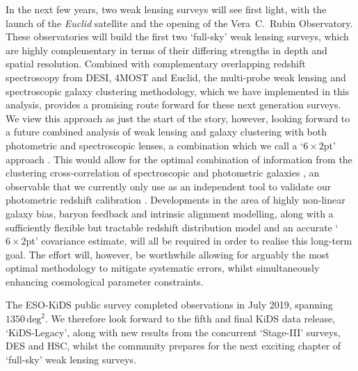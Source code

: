 In the next few years, two weak lensing surveys will see first light, with the launch of the {\it Euclid} satellite and the opening of the Vera~C.~Rubin Observatory.   These observatories will build the first two `full-sky' weak lensing surveys, which are highly complementary in terms of their differing strengths in depth and spatial resolution.  Combined with complementary overlapping redshift spectroscopy from DESI, 4MOST and Euclid, the multi-probe weak lensing and spectroscopic galaxy clustering methodology, which we have implemented in this analysis, provides a promising route forward for these next generation surveys.   We view this \tttp approach as just the start of the story, however, looking forward to a future combined analysis of weak lensing and galaxy clustering with both photometric and spectroscopic lenses, a combination which we call a `$6\times2$pt' approach \citep{bernstein:2009}.    This would allow for the optimal combination of information from the clustering cross-correlation of spectroscopic and photometric galaxies \citep{newman:2008}, an observable that we currently only use as an independent tool to validate our photometric redshift calibration \citep{hildebrandt/etal:inprep}.      Developments in the area of highly non-linear galaxy bias, baryon feedback and intrinsic alignment modelling, along with a sufficiently flexible but tractable redshift distribution model and an accurate `$6\times2$pt' covariance estimate, will all be required in order to realise this long-term goal.   The effort will, however, be worthwhile allowing for arguably the most optimal methodology to mitigate systematic errors, whilst simultaneously enhancing cosmological parameter constraints.

The ESO-KiDS public survey completed observations in July 2019, spanning $1350\,\mathrm{deg}^{2}$.   We therefore look forward to the fifth and final KiDS data release, `KiDS-Legacy', along with new results from the concurrent `Stage-III' surveys, DES and HSC, whilst the community prepares for the next exciting chapter of `full-sky' weak lensing surveys.  